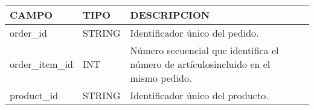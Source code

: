 \documentclass[11pt]{article}
\begin{document}
\begin{longtable}[]{@{}llll@{}}
\toprule
\begin{minipage}[b]{0.22\columnwidth}\raggedright
CAMPO\strut
\end{minipage} & \begin{minipage}[b]{0.22\columnwidth}\raggedright
TIPO\strut
\end{minipage} & \begin{minipage}[b]{0.22\columnwidth}\raggedright
DESCRIPCION\strut
\end{minipage} & \begin{minipage}[b]{0.22\columnwidth}\raggedright
\strut
\end{minipage}\tabularnewline
\midrule
\endhead
\begin{minipage}[t]{0.22\columnwidth}\raggedright
order\_id\strut
\end{minipage} & \begin{minipage}[t]{0.22\columnwidth}\raggedright
STRING\strut
\end{minipage} & \begin{minipage}[t]{0.22\columnwidth}\raggedright
Identificador único del pedido.\strut
\end{minipage} & \begin{minipage}[t]{0.22\columnwidth}\raggedright
\strut
\end{minipage}\tabularnewline
\begin{minipage}[t]{0.22\columnwidth}\raggedright
order\_item\_id\strut
\end{minipage} & \begin{minipage}[t]{0.22\columnwidth}\raggedright
INT\strut
\end{minipage} & \begin{minipage}[t]{0.22\columnwidth}\raggedright
Número secuencial que identifica el número de artículosincluido en el
mismo pedido.\strut
\end{minipage} & \begin{minipage}[t]{0.22\columnwidth}\raggedright
\strut
\end{minipage}\tabularnewline
\begin{minipage}[t]{0.22\columnwidth}\raggedright
product\_id\strut
\end{minipage} & \begin{minipage}[t]{0.22\columnwidth}\raggedright
STRING\strut
\end{minipage} & \begin{minipage}[t]{0.22\columnwidth}\raggedright
Identificador único del producto.\strut

\end{minipage}
\end{longtable}
\end{document}
